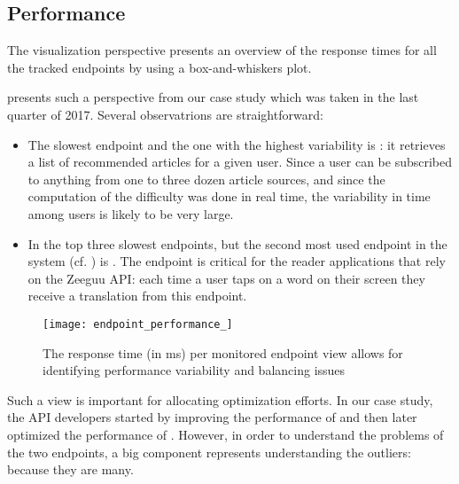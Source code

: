 
\subsection{Performance}
\label{sec:perf}

The  visualization perspective presents
an overview of the response times for all the tracked endpoints 
by using a box-and-whiskers plot. 

 presents such a perspective from our case study which 
was taken in the last quarter of 2017. Several observatrions are 
straightforward: 

\begin{itemize}

  \item The slowest endpoint and the one with the highest variability is \epFeedItemsColor: it retrieves a list of recommended articles for a given user. Since a user can be subscribed to anything from one to three dozen article sources, and since the computation of the difficulty was done in real time, the variability in time among users is likely to be very large. 

  \item In the top three slowest endpoints, but the second most used endpoint in the system (cf. ) is \epTranslationsColor. The endpoint is critical for the reader applications that rely on the Zeeguu API: each time a user taps on a word on their screen they receive a translation from this endpoint.
 
\end{itemize}

\begin{figure}
 \centering
 \texttt{[image: endpoint\_performance\_]}
 \caption{The response time (in ms) per monitored endpoint view allows for identifying performance variability and balancing issues}
 \label{fig:ep}
\end{figure}

Such a view is important for allocating optimization efforts. In our case study, the API developers started by improving the performance of \epTranslationsColor and then later optimized the performance of \epFeedItemsColor. However, in order to understand the problems of the two endpoints, a big component represents understanding the outliers: because they are many.  


